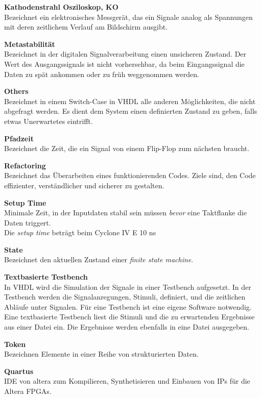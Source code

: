 \textbf{Kathodenstrahl Osziloskop, KO}\\
Bezeichnet ein elektronisches Messgerät, das ein Signale analog als Spannungen mit deren zeitlichem Verlauf am Bildschirm ausgibt.

\textbf{Metastabilität}\\
Bezeichnet in der  digitalen Signalverarbeitung einen unsicheren Zustand. Der Wert des Ausgangssignals ist nicht vorhersehbar, da beim Eingangssignal die Daten zu spät ankommen oder zu früh weggenommen werden.

\textbf{Others}\\
Bezeichnet in einem Switch-Case in VHDL alle anderen Möglichkeiten, die nicht abgefragt werden. Es dient dem System einen definierten Zustand zu geben, falls etwas Unerwartetes eintrifft.

\textbf{Pfadzeit}\\
Bezeichnet die Zeit, die ein Signal von einem Flip-Flop zum nächsten braucht.

\textbf{Refactoring}\\
Bezeichnet das Überarbeiten eines funktionierenden Codes. Ziele sind, den Code effizienter, verständlicher und sicherer zu gestalten.

\textbf{Setup Time} \\
Minimale Zeit, in der Inputdaten stabil sein müssen \textit{bevor} eine Taktflanke die Daten triggert.\\
Die \textit{setup time} beträgt beim Cyclone IV E 10 ns \citep{Handbook_Altera}

\textbf{State}\\
Bezeichnet den aktuellen Zustand einer \textit{finite state machine}.

\textbf{Textbasierte Testbench}\\
In VHDL wird die Simulation der Signale in einer Testbench aufgesetzt. In der Testbench werden die Signalanregungen, Stimuli, definiert, und die zeitlichen Abläufe unter Signalen. Für eine Testbench ist eine eigene Software notwendig.\\
Eine textbasierte Testbench liest die Stimuli und die zu erwartenden Ergebnisse aus einer Datei ein. Die Ergebnisse werden ebenfalls in eine Datei ausgegeben.

\textbf{Token}\\
Bezeichnen Elemente in einer Reihe von strukturierten Daten.

\textbf{Quartus}\\
IDE von altera zum Kompilieren, Synthetisieren und Einbauen von IPs für die Altera FPGAs.
